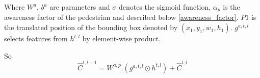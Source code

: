 Where $W^{a}$, $b^{a}$ are parameters and $\sigma$ denotes the sigmoid function, $\alpha_p$ is the awareness factor of the pedestrian and described below \ref{awareness_factor}. $P1$ is the translated position of the bounding box denoted by $(x_1, y_1, w_1, h_1)$.
$g^{a,t,l}$ selects features from ${h}^{t, l}$ by element-wise product.

So 
\begin{equation}
\hat{C}^{t, l+1}= W^{a,p}.(g^{a,t,l} \odot {h}^{t, l} )+  \hat{C}^{t, l}
\end{equation}







